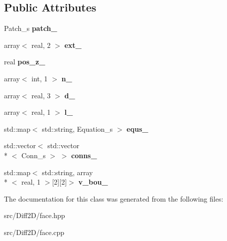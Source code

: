 \subsection*{Public Attributes}
\begin{DoxyCompactItemize}
\item 
\hypertarget{classFace_a2e53c055a4d8492b42995db563e1fc7a}{Patch\-\_\-s {\bfseries patch\-\_\-}}\label{classFace_a2e53c055a4d8492b42995db563e1fc7a}

\item 
\hypertarget{classFace_a0922668c4175d0274024a5869b310a63}{array$<$ real, 2 $>$ {\bfseries ext\-\_\-}}\label{classFace_a0922668c4175d0274024a5869b310a63}

\item 
\hypertarget{classFace_a639f6d684b3a55d69528b5b6f5976937}{real {\bfseries pos\-\_\-z\-\_\-}}\label{classFace_a639f6d684b3a55d69528b5b6f5976937}

\item 
\hypertarget{classFace_ab9b865c72ed43ab63dd5747639bd13f1}{array$<$ int, 1 $>$ {\bfseries n\-\_\-}}\label{classFace_ab9b865c72ed43ab63dd5747639bd13f1}

\item 
\hypertarget{classFace_a7d41239f934e8819874b5fb515d43380}{array$<$ real, 3 $>$ {\bfseries d\-\_\-}}\label{classFace_a7d41239f934e8819874b5fb515d43380}

\item 
\hypertarget{classFace_a75033fb2521fcb2c613782f831f42bb3}{array$<$ real, 1 $>$ {\bfseries l\-\_\-}}\label{classFace_a75033fb2521fcb2c613782f831f42bb3}

\item 
\hypertarget{classFace_a46b37a1eaba00ad44cf46b6da1391b30}{std\-::map$<$ std\-::string, Equation\-\_\-s $>$ {\bfseries equs\-\_\-}}\label{classFace_a46b37a1eaba00ad44cf46b6da1391b30}

\item 
\hypertarget{classFace_ac831a8581fa641c54f4adb6e6b3dfe71}{std\-::vector$<$ std\-::vector\\*
$<$ Conn\-\_\-s $>$ $>$ {\bfseries conns\-\_\-}}\label{classFace_ac831a8581fa641c54f4adb6e6b3dfe71}

\item 
\hypertarget{classFace_a982045b07b690ea86fc8faa77a1cc534}{std\-::map$<$ std\-::string, array\\*
$<$ real, 1 $>$\mbox{[}2\mbox{]}\mbox{[}2\mbox{]}$>$ {\bfseries v\-\_\-bou\-\_\-}}\label{classFace_a982045b07b690ea86fc8faa77a1cc534}

\end{DoxyCompactItemize}


The documentation for this class was generated from the following files\-:\begin{DoxyCompactItemize}
\item 
src/\-Diff2\-D/face.\-hpp\item 
src/\-Diff2\-D/face.\-cpp\end{DoxyCompactItemize}
